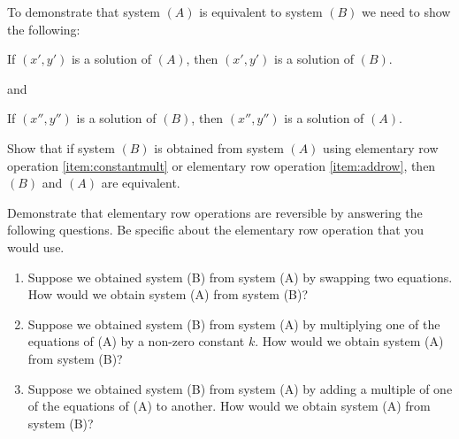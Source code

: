 \documentclass{ximera}
\begin{document}
\begin{problem}\label{prob:equivsystems1}
To demonstrate that system $(A)$ is equivalent to system $(B)$ we need to show the following:
\begin{center}
If $(x', y')$ is a solution of $(A)$, then $(x', y')$ is a solution of $(B)$.

and

If $(x'', y'')$ is a solution of $(B)$, then $(x'', y'')$ is a solution of $(A)$.
\end{center}

Show that  if system $(B)$ is obtained from system $(A)$ using elementary row operation \ref{item:constantmult} or elementary row operation \ref{item:addrow}, then $(B)$ and $(A)$ are equivalent.
\end{problem}
 \begin{problem}\label{prob:elemrowopsreverse}
 Demonstrate that elementary row operations are reversible by answering the following questions.  Be specific about the elementary row operation that you would use.
\begin{enumerate}
 \item Suppose we obtained system (B) from system (A) by swapping two equations. How would we obtain system (A) from system (B)?
 \item Suppose we obtained system (B) from system (A) by multiplying one of the equations of (A) by a non-zero constant $k$.  How would we obtain system (A) from system (B)?
 \item Suppose we obtained system (B) from system (A) by adding a multiple of one of the equations of (A) to  another.  How would we obtain system (A) from system (B)?
 \end{enumerate}
 \end{problem}
\end{document}
